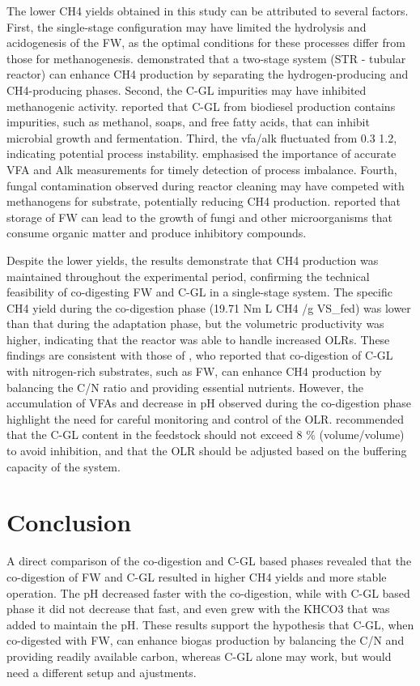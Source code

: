 \documentclass[12pt, a4paper, oneside]{report}
\begin{document}
The lower CH4 yields obtained in this study can be attributed to several factors. First, the single-stage configuration may have limited the hydrolysis and acidogenesis of the FW, as the optimal conditions for these processes differ from those for methanogenesis. \textcite{srimachai2025} demonstrated that a two-stage system (STR - tubular reactor) can enhance CH4 production by separating the hydrogen-producing and CH4-producing phases. Second, the C-GL impurities may have inhibited methanogenic activity. \textcite{anand2012} reported that C-GL from biodiesel production contains impurities, such as methanol, soaps, and free fatty acids, that can inhibit microbial growth and fermentation. Third, the vfa/alk fluctuated from 0.3 1.2, indicating potential process instability. \textcite{ribas2007} emphasised the importance of accurate VFA and Alk measurements for timely detection of process imbalance. Fourth, fungal contamination observed during reactor cleaning may have competed with methanogens for substrate, potentially reducing CH4 production. \textcite{degueurce2020} reported that storage of FW can lead to the growth of fungi and other microorganisms that consume organic matter and produce inhibitory compounds.

Despite the lower yields, the results demonstrate that CH4 production was maintained throughout the experimental period, confirming the technical feasibility of co-digesting FW and C-GL in a single-stage system. The specific CH4 yield during the co-digestion phase (19.71 Nm L CH4 /g VS_fed) was lower than that during the adaptation phase, but the volumetric productivity was higher, indicating that the reactor was able to handle increased OLRs. These findings are consistent with those of \textcite{gebreegziabher2025}, who reported that co-digestion of C-GL with nitrogen-rich substrates, such as FW, can enhance CH4 production by balancing the C/N ratio and providing essential nutrients. However, the accumulation of VFAs and decrease in pH observed during the co-digestion phase highlight the need for careful monitoring and control of the OLR. \textcite{tomczak2025} recommended that the C-GL content in the feedstock should not exceed 8 \% (volume/volume) to avoid inhibition, and that the OLR should be adjusted based on the buffering capacity of the system.
\clearpage{}
\clearpage{}\chapter{Conclusion}

A direct comparison of the co-digestion and C-GL based phases revealed that the co-digestion of FW and C-GL resulted in higher CH4 yields and more stable operation. The pH decreased faster with the co-digestion, while with C-GL based phase it did not decrease that fast, and even grew with the KHCO3 that was added to maintain the pH. These results support the hypothesis that C-GL, when co-digested with FW, can enhance biogas production by balancing the C/N and providing readily available carbon, whereas C-GL alone may work, but would need a different setup and ajustments.
\end{document}
